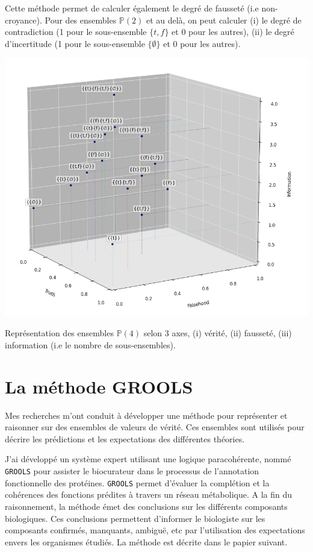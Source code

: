 \begin{refsegment}
Cette méthode permet de calculer également le degré de fausseté (i.e non-croyance). Pour des ensembles  $\mathbb{P}(2)$ et au delà, on peut calculer (i) le degré de contradiction (1 pour le sous-ensemble $\{t,f\}$ et 0 pour les autres), (ii) le degré d'incertitude (1 pour le sous-ensemble $\{\emptyset\}$ et 0 pour les autres).

\begin{shadedfigure}[H]
    \centering
    \includegraphics[width=\textwidth]{img/set_3d.png}
    \caption{Représentation des ensembles  $\mathbb{P}(4)$ selon 3 axes, (i) vérité, (ii) fausseté, (iii) information (i.e le nombre de sous-ensembles).}
    \label{fig:set3d}
\end{shadedfigure}

\section{La méthode GROOLS}\label{sec:methode}

Mes recherches m'ont conduit à développer une méthode pour représenter et raisonner sur des ensembles de valeurs de vérité. Ces ensembles sont utilisés pour décrire les prédictions et les expectations des différentes théories.

J'ai développé un système expert utilisant une logique paracohérente, nommé \texttt{\gls{GROOLS}} pour assister le biocurateur dans le processus de l'annotation fonctionnelle des protéines. \texttt{\gls{GROOLS}} permet d'évaluer la complétion et la cohérences des fonctions prédites à travers un réseau métabolique. A la fin du raisonnement, la méthode émet des conclusions sur les différents composants biologiques. Ces conclusions permettent d'informer le biologiste sur les composants confirmés, manquants, ambiguë, etc par l'utilisation des expectations envers les organismes étudiés. La méthode est décrite dans le papier suivant.


\end{refsegment}

